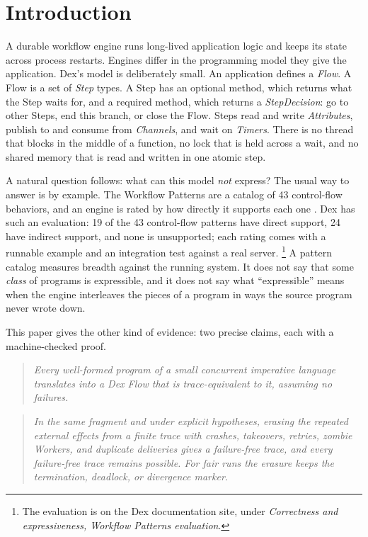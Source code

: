 \section{Introduction}
\label{sec:introduction}

A durable workflow engine runs long-lived application logic and keeps its
state across process restarts. Engines differ in the programming model they
give the application. Dex's model is deliberately small. An application
defines a \emph{Flow}. A Flow is a set of \emph{Step} types. A Step has an
optional  method, which returns what the Step waits for, and a
required  method, which returns a \emph{StepDecision}: go to
other Steps, end this branch, or close the Flow. Steps read and write
\emph{Attributes}, publish to and consume from \emph{Channels}, and wait on
\emph{Timers}. There is no thread that blocks in the middle of a function,
no lock that is held across a wait, and no shared memory that is read and
written in one atomic step.

A natural question follows: what can this model \emph{not} express? The
usual way to answer is by example. The Workflow Patterns
\cite{vanderaalst2003patterns,russell2006revised} are a catalog of 43
control-flow behaviors, and an engine is rated by how directly it supports
each one \cite{wohed2009patterns}. Dex has such an evaluation: 19 of the 43
control-flow patterns have direct support, 24 have indirect support, and
none is unsupported; each rating comes with a runnable example and an
integration test against a real server.%
\footnote{The evaluation is on the Dex documentation site, under
\emph{Correctness and expressiveness, Workflow Patterns evaluation}.}
A pattern catalog measures breadth against the running system. It does not
say that some \emph{class} of programs is expressible, and it does not say
what ``expressible'' means when the engine interleaves the pieces of a
program in ways the source program never wrote down.

This paper gives the other kind of evidence: two precise claims, each with
a machine-checked proof.

\begin{quote}
\emph{Every well-formed program of a small concurrent imperative language
\Lang{} translates into a Dex Flow that is trace-equivalent to it, assuming
no failures.}
\end{quote}

\begin{quote}
\emph{In the same fragment and under explicit hypotheses, erasing the
repeated external effects from a finite trace with crashes, takeovers,
retries, zombie Workers, and duplicate deliveries gives a failure-free
trace, and every failure-free trace remains possible. For fair runs the
erasure keeps the termination, deadlock, or divergence marker.}
\end{quote}

